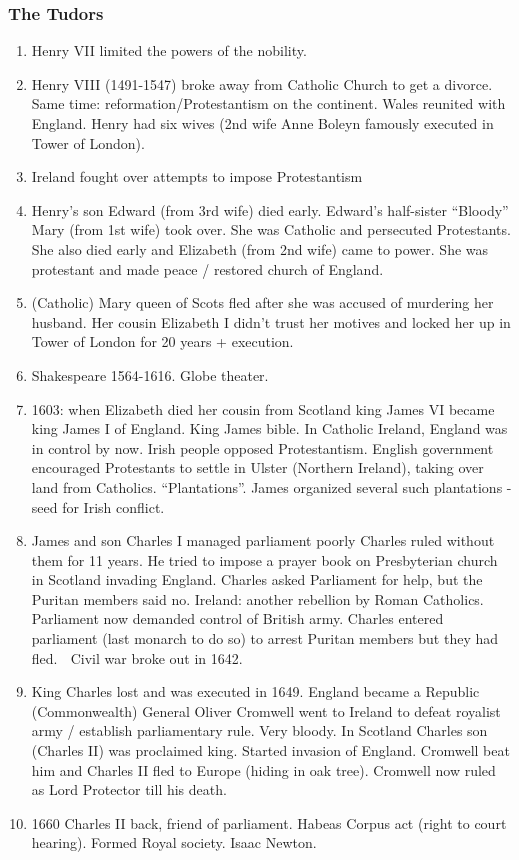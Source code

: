 \documentclass[10pt,reqno]{amsart}
\begin{document}
\subsubsection{The Tudors}


\begin{enumerate}[i]
\item Henry VII limited the powers of the nobility. 
\item Henry VIII (1491-1547) broke away from Catholic Church to get a divorce. Same time: reformation/Protestantism on the continent. Wales reunited with England.
Henry had six wives (2nd wife Anne Boleyn famously executed in Tower of London). 
\item Ireland fought over attempts to impose Protestantism 
\item Henry's son Edward (from 3rd wife) died early. Edward's half-sister ``Bloody'' Mary (from 1st wife) took over. She was Catholic and persecuted Protestants. She also died early and Elizabeth (from 2nd wife) came to power. She was protestant and made peace / restored church of England. 
\item (Catholic) Mary queen of Scots fled after she was accused of murdering her husband. Her cousin Elizabeth I didn't trust her motives and locked her up in Tower of London for 20 years + execution. 
\item Shakespeare 1564-1616. Globe theater. 
\item 1603: when Elizabeth died her cousin from Scotland king James VI became king James I of England. King James bible. 
In Catholic Ireland, England was in control by now. Irish people opposed Protestantism. English government encouraged Protestants to settle in Ulster (Northern Ireland), taking over land from Catholics. ``Plantations''. James organized several such plantations - seed for Irish conflict.
\item James and son Charles I managed parliament poorly
Charles ruled without them for 11 years. He tried to impose a prayer book on Presbyterian church in Scotland invading England. Charles asked Parliament for help, but the Puritan members said no. 
Ireland: another rebellion by Roman Catholics. Parliament now demanded control of British army. Charles entered parliament (last monarch to do so) to arrest Puritan members but they had fled.  Civil war broke out in 1642. 
\item King Charles lost and was executed in 1649. 
England became a Republic (Commonwealth)
General Oliver Cromwell went to Ireland to defeat royalist army / establish parliamentary rule. Very bloody.
In Scotland Charles son (Charles II) was proclaimed king. Started invasion of England. Cromwell beat him and Charles II fled to Europe (hiding in oak tree). Cromwell now ruled as Lord Protector till his death. 
\item 1660 Charles II back, friend of parliament. Habeas Corpus act (right to court hearing). Formed Royal society. Isaac Newton.   


\end{enumerate}
\end{document}
